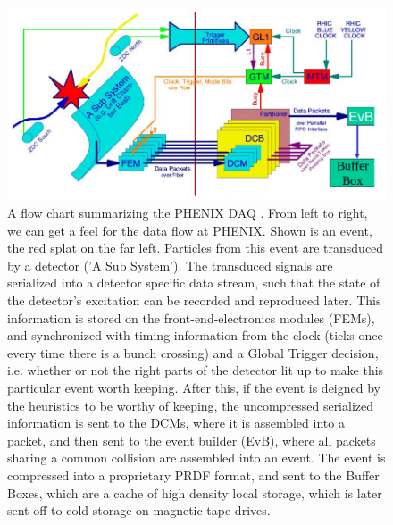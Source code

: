 \begin{figure}
  \includegraphics[width=\linewidth]{./figures/daq_overview}
  \caption{ 
    A flow chart summarizing the PHENIX DAQ \cite{Desmond2016}. From left to
    right, we can get a feel for the data flow at PHENIX. Shown is an event, the
    red splat on the far left. Particles from this event are transduced by a
    detector ('A Sub System'). The transduced signals are serialized into a
    detector specific data stream, such that the state of the detector's
    excitation can be recorded and reproduced later. This information is stored
    on the front-end-electronics modules (FEMs), and synchronized with timing
    information from the clock (ticks once every time there is a bunch crossing)
    and a Global Trigger decision, i.e. whether or not the right parts of the
    detector lit up to make this particular event worth keeping. After this, if
    the event is deigned by the heuristics to be worthy of keeping, the
    uncompressed serialized information is sent to the DCMs, where it is
    assembled into a packet, and then sent to the event builder (EvB), where all
    packets sharing a common collision are assembled into an event. The event is
    compressed into a proprietary PRDF format, and sent to the Buffer Boxes,
    which are a cache of high density local storage, which is later sent off to
    cold storage on magnetic tape drives.
  }
  \label{fig:phenix_daq_overview}
\end{figure}

